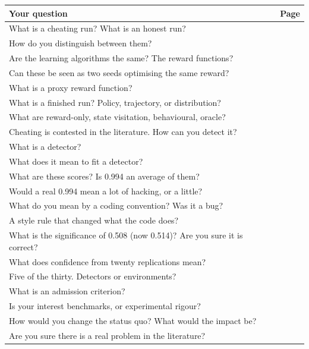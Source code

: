 \documentclass[11pt,a4paper]{article}
\begin{document}
\begin{tabular}{@{}p{10.4cm}r@{}}
\toprule
Your question & Page \\
\midrule
What is a cheating run? What is an honest run? & \pageref{h:words} \\
How do you distinguish between them? & \pageref{h:learn} \\
Are the learning algorithms the same? The reward functions? & \pageref{h:learn} \\
Can these be seen as two seeds optimising the same reward? & \pageref{h:learn} \\
What is a proxy reward function? & \pageref{h:words} \\
What is a finished run? Policy, trajectory, or distribution? & \pageref{h:words} \\
What are reward-only, state visitation, behavioural, oracle? & \pageref{h:levels} \\
Cheating is contested in the literature. How can you detect it? & \pageref{h:learn} \\
What is a detector? & \pageref{h:detector} \\
What does it mean to fit a detector? & \pageref{h:detector} \\
What are these scores? Is 0.994 an average of them? & \pageref{h:score} \\
Would a real 0.994 mean a lot of hacking, or a little? & \pageref{h:score} \\
What do you mean by a coding convention? Was it a bug? & \pageref{h:bug} \\
A style rule that changed what the code does? & \pageref{h:bug} \\
What is the significance of 0.508 (now 0.514)? Are you sure it is correct? & \pageref{h:sure} \\
What does confidence from twenty replications mean? & \pageref{h:repeats} \\
Five of the thirty. Detectors or environments? & \pageref{h:five} \\
What is an admission criterion? & \pageref{h:checks} \\
Is your interest benchmarks, or experimental rigour? & \pageref{h:point3} \\
How would you change the status quo? What would the impact be? & \pageref{h:point3} \\
Are you sure there is a real problem in the literature? & \pageref{h:point3} \\
\bottomrule
\end{tabular}
\end{document}
